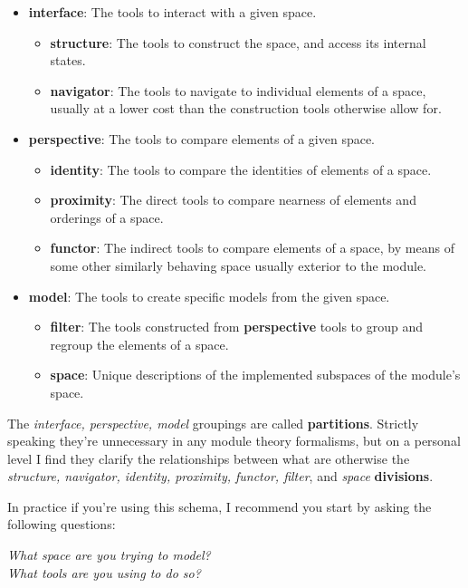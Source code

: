 \documentclass[twoside]{article}
\begin{document}
\begin{itemize}
\item {\bf interface}: The tools to interact with a given space.
	\begin{itemize}
	\item {\bf structure}: The tools to construct the space, and access its internal states.
	\item {\bf navigator}: The tools to navigate to individual elements of a space, usually at a lower cost
                               than the construction tools otherwise allow for.
	\end{itemize}
\item {\bf perspective}: The tools to compare elements of a given space.
	\begin{itemize}
	\item {\bf identity}: The tools to compare the identities of elements of a space.
	\item {\bf proximity}: The direct tools to compare nearness of elements and orderings of a space.
	\item {\bf functor}: The indirect tools to compare elements of a space, by means of some other similarly
			     behaving space usually exterior to the module.
	\end{itemize}
\item {\bf model}: The tools to create specific models from the given space.
	\begin{itemize}
	\item {\bf filter}: The tools constructed from {\bf perspective} tools to group and regroup the elements of a space.
	\item {\bf space}: Unique descriptions of the implemented subspaces of the module's space.
	\end{itemize}
\end{itemize}
The \emph{interface, perspective, model} groupings are called {\bf partitions}. Strictly speaking they're unnecessary
in any module theory formalisms, but on a personal level I find they clarify the relationships between what
are otherwise the \emph{structure, navigator, identity, proximity, functor, filter}, and \emph{space} {\bf divisions}.

In practice if you're using this schema, I recommend you start by asking the following questions:

\begin{center}
\emph{What space are you trying to model?\\
What tools are you using to do so?}
\end{center}
\end{document}
